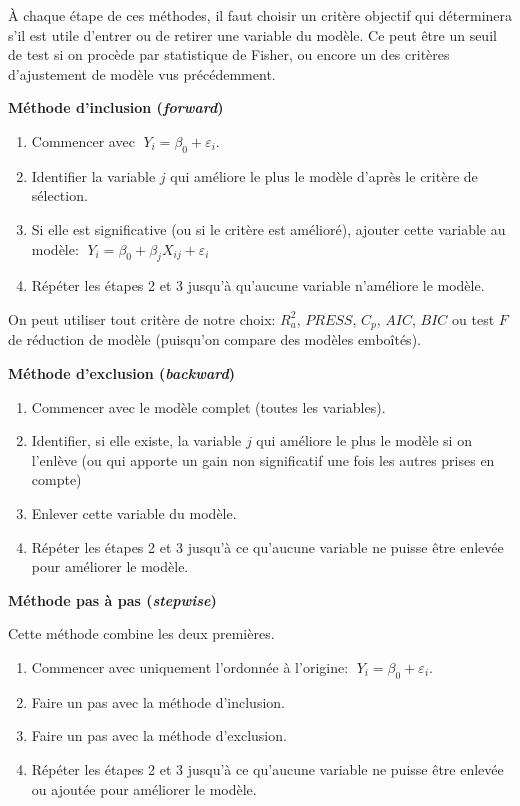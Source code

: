 À chaque étape de ces méthodes, il faut choisir un critère objectif qui déterminera s'il est utile d'entrer ou de retirer une variable du modèle. Ce peut être un seuil de test si on procède par statistique de Fisher, ou encore un des critères d'ajustement de modèle vus précédemment.

\newpage
\textbf{Méthode d'inclusion (\textit{forward}) }

\begin{enumerate}
\item Commencer avec $ \; Y_i = \beta_0 + \varepsilon_i$.
\item Identifier la variable $j$ qui améliore le plus le modèle d'après le critère de sélection.
\item Si elle est significative (ou si le critère est amélioré), ajouter cette variable au modèle: $\; Y_i = \beta_0 + \beta_j X_{ij} + \varepsilon_i$
\item Répéter les étapes 2 et 3 jusqu'à qu'aucune variable n'améliore le modèle.
\end{enumerate}


On peut utiliser tout critère de notre choix: $R_a^2$, $PRESS$, $C_p$, $AIC$, $BIC$ ou test $F$ de réduction de modèle (puisqu'on compare des modèles emboîtés).


\textbf{Méthode d'exclusion (\textit{backward})}


\begin{enumerate}
\item Commencer avec le modèle complet (toutes les variables).
\item Identifier, si elle existe, la variable $j$ qui améliore le plus le modèle si on l'enlève (ou qui apporte un gain non significatif une fois les autres prises en compte)
\item Enlever cette variable du modèle.
\item Répéter les étapes 2 et 3 jusqu'à ce qu'aucune variable ne puisse être enlevée pour améliorer le modèle.
\end{enumerate}


\textbf{Méthode pas à pas (\textit{stepwise})}

Cette méthode combine les deux premières.

\begin{enumerate}
\item Commencer avec uniquement l'ordonnée à l'origine: $ \; Y_i = \beta_0 + \varepsilon_i$.
\item Faire un pas avec la méthode d'inclusion.
\item Faire un pas avec la méthode d'exclusion.
\item Répéter les étapes 2 et 3 jusqu'à ce qu'aucune variable ne puisse être enlevée ou ajoutée pour améliorer le modèle.
\end{enumerate}

